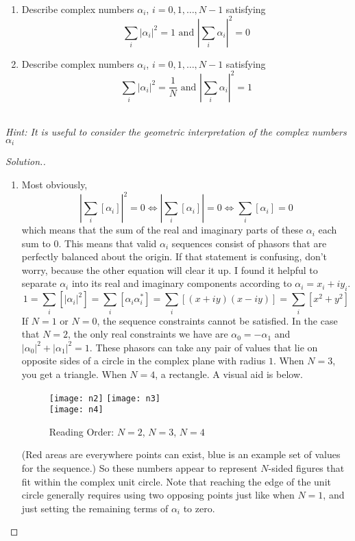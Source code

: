 \documentclass[12pt]{article}
\newenvironment{problem}[2][Problem]{\begin{trivlist}
\item[\hskip \labelsep {\bfseries #1}\hskip \labelsep {\bfseries #2.}]}{\end{trivlist}}
\begin{document}
\begin{problem}{6.1.2}~\\
\begin{enumerate}[label=(\alph*)]
  \item Describe complex numbers $\alpha_i$, $i=0,1,\ldots,N-1$ satisfying
	$$\sum_i|\alpha_i|^2=1\text{ and }\left|\sum_i\alpha_i\right|^2=0$$
  \item Describe complex numbers $\alpha_i$, $i=0,1,\ldots,N-1$ satisfying
  	$$\sum_i|\alpha_i|^2=\frac{1}{N}\text{ and }\left|\sum_i\alpha_i\right|^2=1$$
\end{enumerate}~\\[0.3in]
\emph{Hint: It is useful to consider the geometric interpretation of the complex numbers $\alpha_i$}
\end{problem}

\begin{proof}[Solution.]~\\
\begin{enumerate}[label=(\alph*)]
\item Most obviously, 
$$\left|\sum_i[\alpha_i]\right|^2=0\iff\left|\sum_i[\alpha_i]\right|=0\iff\sum_i[\alpha_i]=0$$
which means that the sum of the real and imaginary parts of these $\alpha_i$ each sum to 0. This means that valid
$\alpha_i$ sequences consist of phasors that are perfectly balanced about the origin. If that statement is confusing, don't
worry, because the other equation will clear it up. I found it helpful to separate $\alpha_i$ into its real and imaginary
components according to $\alpha_i=x_i+iy_i$.
$$1=\sum_i\left[|\alpha_i|^2\right]=\sum_i[\alpha_i\alpha_i^*]=\sum_i[(x+iy)(x-iy)]=\sum_i[x^2+y^2]$$
If $N=1$ or $N=0$, the sequence constraints cannot be satisfied. In the case that $N=2$, the only real constraints we have are
$\alpha_0=-\alpha_1$ and $|\alpha_0|^2+|\alpha_1|^2=1$. These phasors can take any pair of values that lie on opposite
sides of a circle in the complex plane with radius $1$. When $N=3$, you get a triangle. When $N=4$, a rectangle. A visual aid
is below.
\begin{figure}[H]
\centering
\texttt{[image: n2]}\hfill
\texttt{[image: n3]}\\
\texttt{[image: n4]}
\label{fig:circles}
\caption{Reading Order: $N=2$, $N=3$, $N=4$}
\end{figure}
(Red areas are everywhere points can exist, blue is an example set of values for the sequence.)
So these numbers appear to represent $N$-sided figures that fit within the complex unit circle. Note that reaching the edge
of the unit circle generally requires using two opposing points just like when $N=1$, and just setting the remaining terms of
$\alpha_i$ to zero.


\end{enumerate}
\end{proof}
\end{document}
